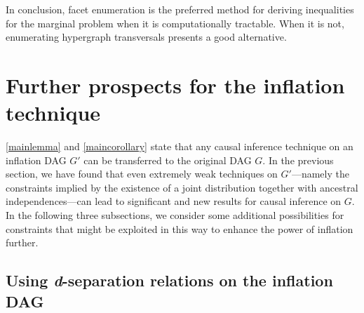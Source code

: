 \documentclass[aps,english,10pt,superscriptaddress,onecolumn,twoside,longbibliography,pra,floatfix,fleqn,nofootinbib]{revtex4-1}%
\theoremstyle{definition}
\begin{document}
In conclusion, facet enumeration is the preferred method for deriving inequalities for the marginal problem when it is computationally tractable.  When it is not, enumerating hypergraph transversals presents a good alternative.


\section{Further prospects for the inflation technique}\label{sec:otherprospects}

\cref{mainlemma} and \cref{maincorollary} state that any causal inference technique on an inflation DAG $G'$ can be transferred to the original DAG $G$. In the previous section, we have found that even extremely weak techniques on $G'$---namely the constraints implied by the existence of a joint distribution together with ancestral independences---can lead to significant and new results for causal inference on $G$. In the following three subsections, we consider some additional possibilities for constraints that might be exploited in this way to enhance the power of inflation further.


\subsection{Using \textit{d}-separation relations on the inflation DAG}\label{sec:fulldsep}
\end{document}
